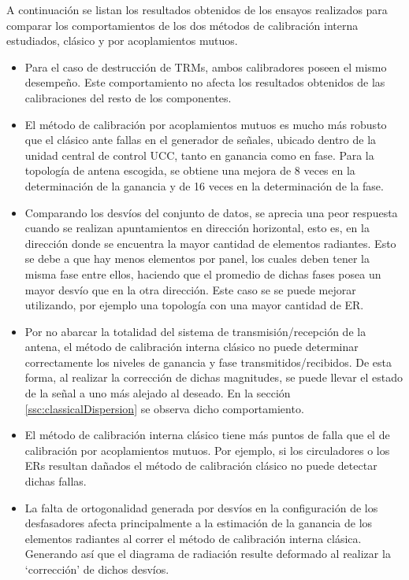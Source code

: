 A continuación se listan los resultados obtenidos de los ensayos realizados para comparar los comportamientos de los dos métodos
de calibración interna estudiados, clásico y por acoplamientos mutuos. 
\begin{itemize}
	\item Para el caso de destrucción de TRMs, ambos calibradores poseen el mismo desempeño. Este comportamiento no afecta los
		resultados obtenidos de las calibraciones del resto de los componentes.
		
	\item El método de calibración por acoplamientos mutuos es mucho más robusto que el clásico ante fallas en el generador de
		señales, ubicado dentro de la unidad central de control UCC, tanto en ganancia como en fase. Para la topología de antena
		escogida, se obtiene una mejora de 8 veces en la determinación de la ganancia y de 16 veces en la determinación de la
		fase.
	\item Comparando los desvíos del conjunto de datos, se aprecia una peor respuesta cuando se realizan apuntamientos 
		en dirección horizontal, esto es, en la dirección donde se encuentra la mayor cantidad de elementos radiantes. Esto se
		debe a que hay menos elementos por panel, los cuales deben tener la misma fase entre ellos, haciendo que el promedio de
		dichas fases posea un mayor desvío que en la otra dirección. Este caso se se puede mejorar utilizando, por ejemplo una
		topología con una mayor cantidad de ER.
	\item Por no abarcar la totalidad del sistema de transmisión/recepción de la antena, el método de calibración interna clásico
		no puede determinar correctamente los niveles de ganancia y fase transmitidos/recibidos. De esta forma, al realizar la
		corrección de dichas magnitudes, se puede llevar el estado de la señal a uno más alejado al deseado. En la sección
		\ref{ssc:classicalDispersion} se observa dicho comportamiento. 
	\item El método de calibración interna clásico tiene más puntos de falla que el de calibración por acoplamientos mutuos. Por
		ejemplo, si los circuladores o los ERs resultan dañados el método de calibración clásico no puede detectar dichas fallas.
	\item La falta de ortogonalidad generada por desvíos en la configuración de los desfasadores afecta principalmente a la 
		estimación de la ganancia de los elementos radiantes al correr el método de calibración interna clásica. Generando así
		que el diagrama de radiación resulte deformado al realizar la \enquote*{corrección} de dichos desvíos.


\end{itemize}
